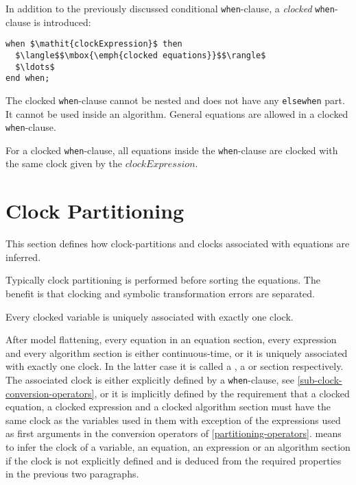 In addition to the previously discussed conditional \lstinline!when!-clause, a \emph{clocked} \lstinline!when!-clause is introduced:
\begin{lstlisting}[language=modelica]
when $\mathit{clockExpression}$ then
  $\langle$$\mbox{\emph{clocked equations}}$$\rangle$
  $\ldots$
end when;
\end{lstlisting}

The clocked \lstinline!when!-clause cannot be nested and does not have any \lstinline!elsewhen! part.  It cannot be used inside an algorithm.  General equations are allowed in a clocked \lstinline!when!-clause.

For a clocked \lstinline!when!-clause, all equations inside the \lstinline!when!-clause are clocked with the same clock given by the $\mathit{clockExpression}$.

\section{Clock Partitioning}\label{clock-partitioning}

This section defines how clock-partitions and clocks associated with
equations are inferred.

\begin{nonnormative}
Typically clock partitioning is performed before sorting the equations.  The benefit is that clocking and symbolic transformation errors are separated.
\end{nonnormative}

Every clocked variable is uniquely associated with exactly one clock.

After model flattening, every equation in an equation section, every expression and every algorithm section is either continuous-time, or it is uniquely associated with exactly one clock.
In the latter case it is called a , a  or  section respectively.
The associated clock is either explicitly defined by a \lstinline!when!-clause, see \cref{sub-clock-conversion-operators}, or it is implicitly defined by the requirement that a clocked equation, a clocked expression and a clocked algorithm section must have the same clock as the variables used in them with exception of the expressions used as first arguments in the conversion operators of \cref{partitioning-operators}.
 means to infer the clock of a variable, an equation, an expression or an algorithm section if the clock is not explicitly defined and is deduced from the required properties in the previous two paragraphs.

